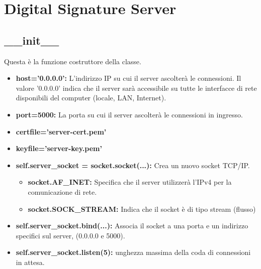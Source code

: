 \section{Digital Signature Server}

\subsection{\_\_init\_\_}

Questa è la funzione costruttore della classe.
\begin{itemize}
    \item \textbf{host='0.0.0.0':} L’indirizzo IP su cui il server ascolterà le connessioni.  Il valore '0.0.0.0' indica che il server sarà accessibile su tutte le interfacce di rete disponibili del computer (locale, LAN, Internet).
    \item \textbf{port=5000:} La porta su cui il server ascolterà le connessioni in ingresso. 
    \item \textbf{certfile='server-cert.pem'}
    \item \textbf{keyfile='server-key.pem'}
\end{itemize} 

\begin{itemize}
    \item \textbf{self.server\_socket = socket.socket(...): } Crea un nuovo socket TCP/IP.
    \begin{itemize}
        \item \textbf{socket.AF\_INET: } Specifica che il server utilizzerà l’IPv4 per la comunicazione di rete.
        \item \textbf{socket.SOCK\_STREAM: }  Indica che il socket è di tipo stream (flusso)
    \end{itemize}
    \item \textbf{self.server\_socket.bind(...): } Associa il socket a una porta e un indirizzo specifici sul server, (0.0.0.0 e 5000).
    \item \textbf{self.server\_socket.listen(5): } unghezza massima della coda di connessioni in attesa.
\end{itemize}